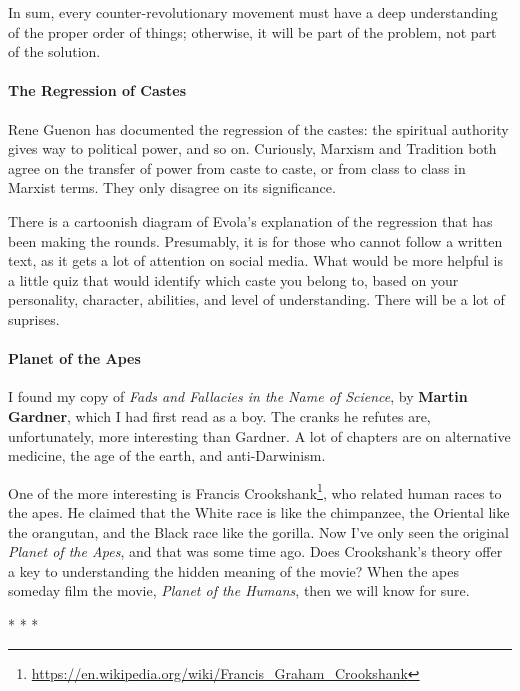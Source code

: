 In sum, every counter-revolutionary movement must have a deep understanding of the proper order of things; otherwise, it will be part of the problem, not part of the solution.

\paragraph{The Regression of Castes}
Rene Guenon has documented the regression of the castes: the spiritual authority gives way to political power, and so on. Curiously, Marxism and Tradition both agree on the transfer of power from caste to caste, or from class to class in Marxist terms. They only disagree on its significance.

There is a cartoonish diagram of Evola's explanation of the regression that has been making the rounds. Presumably, it is for those who cannot follow a written text, as it gets a lot of attention on social media. What would be more helpful is a little quiz that would identify which caste you belong to, based on your personality, character, abilities, and level of understanding. There will be a lot of suprises.

\paragraph{Planet of the Apes}
I found my copy of \emph{Fads and Fallacies in the Name of Science}, by \textbf{Martin Gardner}, which I had first read as a boy. The cranks he refutes are, unfortunately, more interesting than Gardner. A lot of chapters are on alternative medicine, the age of the earth, and anti-Darwinism.

One of the more interesting is Francis Crookshank\footnote{\url{https://en.wikipedia.org/wiki/Francis_Graham_Crookshank}}, who related human races to the apes. He claimed that the White race is like the chimpanzee, the Oriental like the orangutan, and the Black race like the gorilla. Now I've only seen the original \textit{Planet of the Apes}, and that was some time ago. Does Crookshank's theory offer a key to understanding the hidden meaning of the movie? When the apes someday film the movie, \emph{Planet of the Humans}, then we will know for sure.




\begin{center}* * *\end{center}

